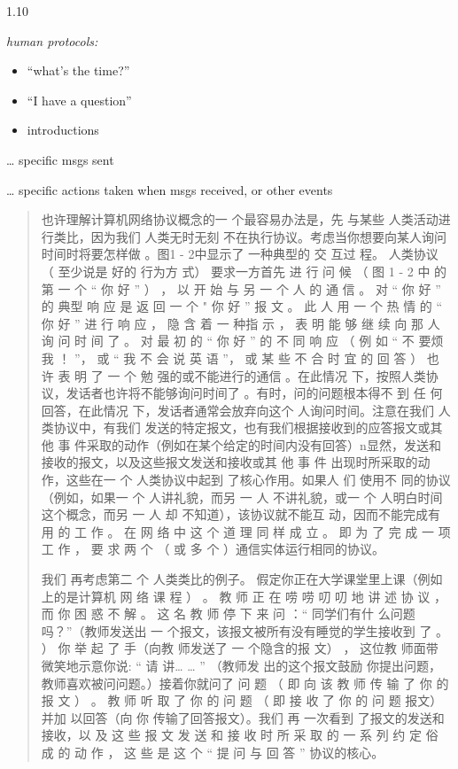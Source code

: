 \documentclass[
]{article}
\begin{document}
1.10

\emph{human protocols:}

\begin{itemize}
\item
  ``what's the time?''
\item
  ``I have a question''
\item
  introductions
\end{itemize}

\ldots{} specific msgs sent

\ldots{} specific actions taken when msgs received, or other events

\begin{quote}
也许理解计算机网络协议概念的一 个最容易办法是，先 与某些
人类活动进行类比，因为我们 人类无时无刻
不在执行协议。考虑当你想要向某人询问时间时将要怎样做 。图1 - 2中显示了
一种典型的 交 互过 程。 人类协议 （ 至少说是 好的 行为方 式）
要求一方首先 进 行 问 候 （ 图 1 - 2 中 的 第 一 个 `` 你 好 '' ） ， 以
开 始 与 另 一 个 人 的 通 信 。 对 `` 你 好 '' 的 典型 响 应 是 返 回
一 个 " 你 好 '' 报 文 。 此 人 用 一 个 热 情 的 `` 你 好 '' 进 行 响
应 ， 隐 含 着 一 种指 示 ， 表 明 能 够 继 续 向 那 人 询 问 时 间 了
。 对 最 初 的 `` 你 好 '' 的 不 同 响 应 （ 例 如 `` 不 要烦 我 ！ ''，
或 `` 我 不 会 说 英 语 ''， 或 某 些 不 合 时 宜 的 回 答 ） 也 许 表
明 了 一 个 勉 强的或不能进行的通信 。在此情况
下，按照人类协议，发话者也许将不能够询问时间了 。有时，问的问题根本得不
到 任 何回答，在此情况 下，发话者通常会放弃向这个 人询问时间。注意在我们
人类协议中，有我们 发送的特定报文，也有我们根据接收到的应答报文或其 他
事
件采取的动作（例如在某个给定的时间内没有回答）n显然，发送和接收的报文，以及这些报文发送和接收或其
他 事 件 出现时所采取的动 作，这些在一 个 人类协议中起到
了核心作用。如果人 们 使用不 同的协议（例如，如果一 个 人讲礼貌，而另 一
人 不讲礼貌，或一 个 人明白时间这个概念，而另 一 人 却
不知道），该协议就不能互 动，因而不能完成有用 的 工 作 。 在 网 络 中 这
个 道 理 同 样 成 立 。 即 为 了 完 成 一 项 工 作 ， 要 求 两 个 （ 或
多 个 ）通信实体运行相同的协议。

我们 再考虑第二 个 人类类比的例子。
假定你正在大学课堂里上课（例如上的是计算机 网 络 课 程 ） 。 教 师 正 在
唠 唠 叨 叨 地 讲 述 协 议 ， 而 你 困 惑 不 解 。 这 名 教 师 停 下 来
问 ：`` 同学们有什 么问题吗？''（教师发送出 一
个报文，该报文被所有没有睡觉的学生接收到 了 。 ） 你 举 起 了 手（向教
师发送了 一 个隐含的报 文） ， 这位教 师面带 微笑地示意你说: `` 请
讲\ldots{} \ldots{} '' （教师发 出的这个报文鼓励
你提出问题，教师喜欢被问问题。）接着你就问了 问 题 （ 即 向 该 教 师 传
输 了 你 的 报 文 ） 。 教 师 听 取 了 你 的 问 题 （ 即 接 收 了 你 的
问 题 报文）并加 以回答（向 你 传输了回答报文）。我们 再 一次看到
了报文的发送和接收，以 及 这 些 报 文 发 送 和 接 收 时 所 采 取 的 一
系 列 约 定 俗 成 的 动 作 ， 这 些 是 这 个 `` 提 问 与 回 答 ''
协议的核心。
\end{quote}
\end{document}
